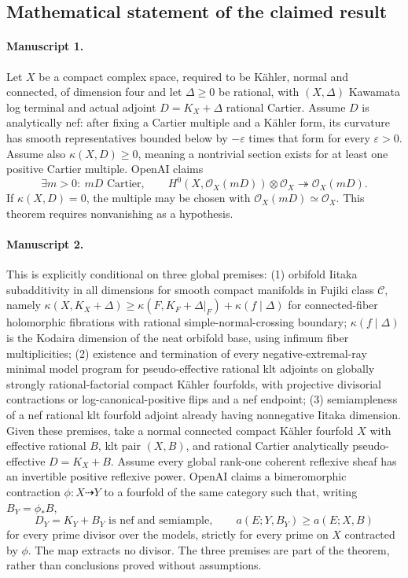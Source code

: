 \documentclass[11pt]{article}
\begin{document}
\subsection{Mathematical statement of the claimed result}
\paragraph{Manuscript 1.}
Let $X$ be a compact complex space, required to be Kähler, normal and connected, of dimension four and let $\Delta\ge0$ be rational, with $(X,\Delta)$ Kawamata log terminal and actual adjoint $D=K_X+\Delta$ rational Cartier. Assume $D$ is analytically nef: after fixing a Cartier multiple and a Kähler form, its curvature has smooth representatives bounded below by $-\varepsilon$ times that form for every $\varepsilon>0$. Assume also $\kappa(X,D)\ge0$, meaning a nontrivial section exists for at least one positive Cartier multiple. OpenAI claims
\[
\exists m>0:\ mD\text{ Cartier},\qquad
H^0(X,\mathcal O_X(mD))\otimes\mathcal O_X\twoheadrightarrow\mathcal O_X(mD).
\]
If $\kappa(X,D)=0$, the multiple may be chosen with $\mathcal O_X(mD)\simeq\mathcal O_X$. This theorem requires nonvanishing as a hypothesis.

\paragraph{Manuscript 2.}
This is explicitly conditional on three global premises: (1) orbifold Iitaka subadditivity in all dimensions for smooth compact manifolds in Fujiki class $\mathcal C$, namely $\kappa(X,K_X+\Delta)\ge\kappa(F,K_F+\Delta|_F)+\kappa(f\mid\Delta)$ for connected-fiber holomorphic fibrations with rational simple-normal-crossing boundary; $\kappa(f\mid\Delta)$ is the Kodaira dimension of the neat orbifold base, using infimum fiber multiplicities; (2) existence and termination of every negative-extremal-ray minimal model program for pseudo-effective rational klt adjoints on globally strongly rational-factorial compact Kähler fourfolds, with projective divisorial contractions or log-canonical-positive flips and a nef endpoint; (3) semiampleness of a nef rational klt fourfold adjoint already having nonnegative Iitaka dimension.
Given these premises, take a normal connected compact Kähler fourfold $X$ with effective rational $B$, klt pair $(X,B)$, and rational Cartier analytically pseudo-effective $D=K_X+B$. Assume every global rank-one coherent reflexive sheaf has an invertible positive reflexive power. OpenAI claims a bimeromorphic contraction $\phi:X\dashrightarrow Y$ to a fourfold of the same category such that, writing $B_Y=\phi_*B$,
\[
D_Y=K_Y+B_Y\text{ is nef and semiample},\qquad
 a(E;Y,B_Y)\ge a(E;X,B)
\]
for every prime divisor over the models, strictly for every prime on $X$ contracted by $\phi$. The map extracts no divisor. The three premises are part of the theorem, rather than conclusions proved without assumptions.
\end{document}
